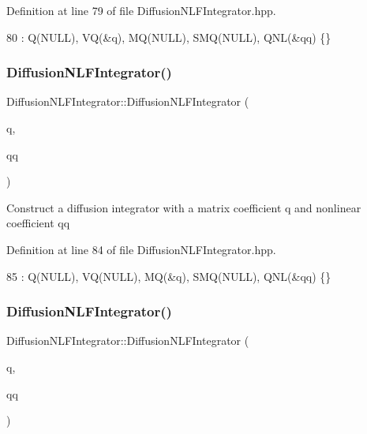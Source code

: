 Definition at line 79 of file Diffusion\+N\+L\+F\+Integrator.\+hpp.


\begin{DoxyCode}
80       : Q(NULL), VQ(&q), MQ(NULL), SMQ(NULL), QNL(&qq) \{\}
\end{DoxyCode}
\mbox{\label{classDiffusionNLFIntegrator_a12fc3a8e2a499ca7751d570df106bcf3}} 
\subsubsection{\texorpdfstring{Diffusion\+N\+L\+F\+Integrator()}{DiffusionNLFIntegrator()}\hspace{0.1cm}{\footnotesize\ttfamily [4/5]}}
{\footnotesize\ttfamily Diffusion\+N\+L\+F\+Integrator\+::\+Diffusion\+N\+L\+F\+Integrator (\begin{DoxyParamCaption}\item[{mfem\+::\+Matrix\+Coefficient \&}]{q,  }\item[{\hyperlink{classNonlinearCoefficient}{Nonlinear\+Coefficient} \&}]{qq }\end{DoxyParamCaption})\hspace{0.3cm}{\ttfamily [inline]}}

Construct a diffusion integrator with a matrix coefficient q and nonlinear coefficient qq 

Definition at line 84 of file Diffusion\+N\+L\+F\+Integrator.\+hpp.


\begin{DoxyCode}
85       : Q(NULL), VQ(NULL), MQ(&q), SMQ(NULL), QNL(&qq) \{\}
\end{DoxyCode}
\mbox{\label{classDiffusionNLFIntegrator_adcfdeb40ded7183d014271e67dd767b5}} 
\subsubsection{\texorpdfstring{Diffusion\+N\+L\+F\+Integrator()}{DiffusionNLFIntegrator()}\hspace{0.1cm}{\footnotesize\ttfamily [5/5]}}
{\footnotesize\ttfamily Diffusion\+N\+L\+F\+Integrator\+::\+Diffusion\+N\+L\+F\+Integrator (\begin{DoxyParamCaption}\item[{mfem\+::\+Symmetric\+Matrix\+Coefficient \&}]{q,  }\item[{\hyperlink{classNonlinearCoefficient}{Nonlinear\+Coefficient} \&}]{qq }\end{DoxyParamCaption})\hspace{0.3cm}{\ttfamily [inline]}}

